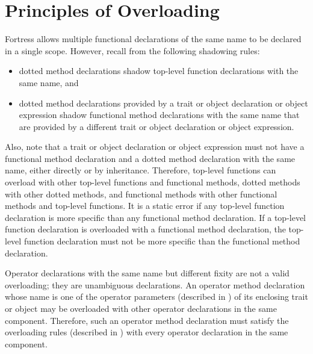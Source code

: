 \section{Principles of Overloading}

Fortress allows multiple functional declarations of the same name to
be declared in a single scope.  However, recall from 
the following shadowing rules:
\begin{itemize}
\item
dotted method declarations shadow top-level function declarations with
the same name, and
\item
dotted method declarations provided by a trait or object declaration
or object expression
shadow functional method declarations with the same name that are
provided by a different trait or object declaration
or object expression.
\end{itemize}
Also, note that a trait or object declaration
or object expression must not have a
functional method declaration and a dotted method declaration with the
same name, either directly or by inheritance.
Therefore, top-level functions can overload
with other top-level functions and functional methods,
dotted methods with other dotted methods,
and functional methods with other functional methods and top-level functions.
It is a static error if any top-level function declaration is
more specific than any functional method declaration.
If a top-level function declaration is overloaded with a functional method
declaration, the top-level function declaration must not be more specific than
the functional method declaration.


Operator declarations with the same name but different fixity
are not a valid overloading; they are unambiguous declarations.
An operator method declaration whose name is one of the operator parameters
(described in )
of its enclosing trait or object may be overloaded with other operator
declarations in the same component.
Therefore, such an operator method declaration
must satisfy the overloading rules
(described in )
with every operator declaration in the same component.


